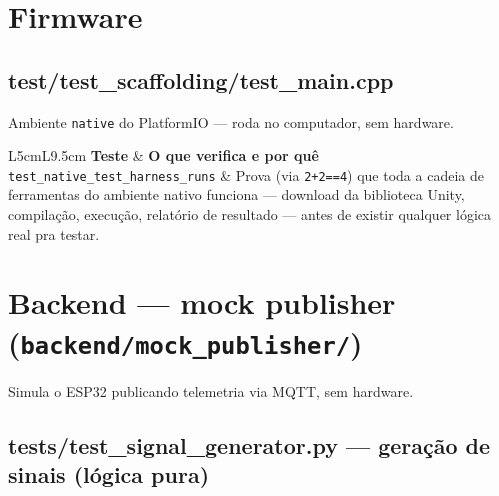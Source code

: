 \documentclass[10pt,a4paper]{article}
\begin{document}
\section{Firmware}

\subsection{test/test\_\allowbreak scaffolding/test\_\allowbreak main.cpp}

Ambiente \texttt{native} do PlatformIO — roda no computador, sem hardware.

\begin{center}
\begin{longtable}{L{5cm}L{9.5cm}}
\toprule
\textbf{Teste} & \textbf{O que verifica e por quê} \\
\midrule
\endhead
\texttt{test\_\allowbreak native\_\allowbreak test\_\allowbreak harness\_\allowbreak runs} & Prova (via \texttt{2+2==4}) que toda a cadeia de ferramentas do ambiente nativo funciona — download da biblioteca Unity, compilação, execução, relatório de resultado — antes de existir qualquer lógica real pra testar. \\
\bottomrule
\end{longtable}
\end{center}

\section{Backend --- mock publisher (\texttt{backend/mock\_\allowbreak publisher/})}

Simula o ESP32 publicando telemetria via MQTT, sem hardware.

\subsection{tests/test\_\allowbreak signal\_\allowbreak generator.py --- geração de sinais (lógica pura)}
\end{document}
